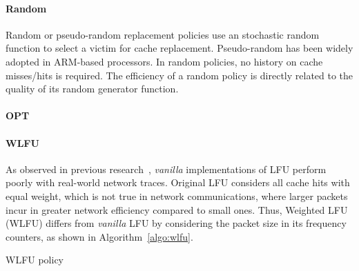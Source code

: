 \paragraph{Random}

Random or pseudo-random replacement policies use an stochastic random function to select a victim for cache replacement.
Pseudo-random has been widely adopted in ARM-based processors.
In random policies, no history on cache misses/hits is required.
The efficiency of a random policy is directly related to the quality of its random generator function.

\paragraph{OPT}

\paragraph{WLFU}
As observed in previous research~\cite{Kim:09}, \textit{vanilla} implementations of LFU perform poorly with real-world network traces.
Original LFU considers all cache hits with equal weight, which is not true in network communications, where larger packets incur in greater network efficiency compared to small ones.
Thus, Weighted LFU (WLFU) differs from \textit{vanilla} LFU by considering the packet size in its frequency counters, as shown in Algorithm~\ref{algo:wlfu}.

\begin{algorithm}[]
\caption{WLFU policy}
\label{algo:wlfu}
\SetInd{0.1em}{.9em}
\SetAlgoLined
\footnotesize
{}
%
%
%
%
%
\end{algorithm}


